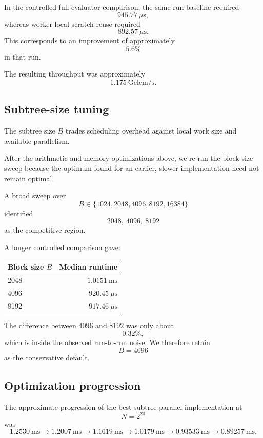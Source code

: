 In the controlled full-evaluator comparison, the same-run baseline required
\[
945.77\ \mu\mathrm{s},
\]
whereas worker-local scratch reuse required
\[
892.57\ \mu\mathrm{s}.
\]
This corresponds to an improvement of approximately
\[
5.6\%
\]
in that run.

The resulting throughput was approximately
\[
1.175\ \mathrm{Gelem/s}.
\]

\subsection{Subtree-size tuning}

The subtree size \(B\) trades scheduling overhead against local work size
and available parallelism.

After the arithmetic and memory optimizations above, we re-ran the block
size sweep because the optimum found for an earlier, slower implementation
need not remain optimal.

A broad sweep over
\[
B\in
\{1024,2048,4096,8192,16384\}
\]
identified
\[
2048,\ 4096,\ 8192
\]
as the competitive region.

A longer controlled comparison gave:

\begin{center}
\begin{tabular}{lr}
\toprule
Block size \(B\) & Median runtime \\
\midrule
2048 & \(1.0151\ \mathrm{ms}\) \\
4096 & \(920.45\ \mu\mathrm{s}\) \\
8192 & \(917.46\ \mu\mathrm{s}\) \\
\bottomrule
\end{tabular}
\end{center}

The difference between \(4096\) and \(8192\) was only about
\[
0.32\%,
\]
which is inside the observed run-to-run noise.  We therefore retain
\[
\boxed{B=4096}
\]
as the conservative default.

\subsection{Optimization progression}

The approximate progression of the best subtree-parallel implementation at
\[
N=2^{20}
\]
was
\[
1.2530\ \mathrm{ms}
\rightarrow
1.2007\ \mathrm{ms}
\rightarrow
1.1619\ \mathrm{ms}
\rightarrow
1.0179\ \mathrm{ms}
\rightarrow
0.93533\ \mathrm{ms}
\rightarrow
\boxed{0.89257\ \mathrm{ms}}.
\]


